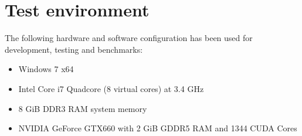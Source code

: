\section{Test environment}
\label{sec:test_environment}

The following hardware and software configuration has been used for development, testing and benchmarks:

\begin{itemize}
	\item Windows 7 x64
	\item Intel Core i7 Quadcore (8 virtual cores) at 3.4 GHz
	\item 8 GiB DDR3 RAM system memory
	\item NVIDIA GeForce GTX660 with 2 GiB GDDR5 RAM and 1344 CUDA Cores
\end{itemize}
